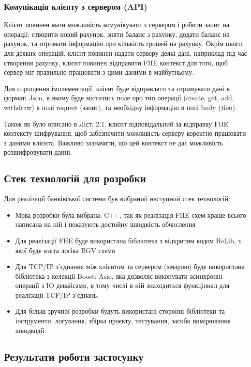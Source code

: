 \subsubsection*{Комунікація клієнту з сервером (API)}
Клієнт повинен мати можливість комунікувати з сервером і робити запит на операції: створити
новий рахунок, зняти баланс з рахунку, додати баланс на рахунок, та отримати інформацію
про кількість грошей на рахунку. Окрім цього, для деяких операцій, клієнт повинен надати
серверу деякі дані, наприклад під час створення рахунку, клієнт повинен відправити FHE контекст
для того, щоб сервер міг правильно працювати з цими даними в майбутньому.

Для спрощення імплементації, клієнт буде відправляти та отримувати дані в форматі Json, в
якому буде міститись поле про тип операції (create, get, add, withdraw) в полі 
request (запит), та необхідну інформацію в полі body (тіло).

Також як було описано в Ліст. 2.1. клієнт відповідальний за відправку FHE контексту шифрування,
щоб забезпечити можливість серверу коректно працювати з даними клієнта. Важливо зазначити, що
цей контекст не дає можливість розшифровувати данні.

\subsection{Стек технологій для розробки}
Для реалізації банківської системи був вибраний наступний стек технологій:
\begin{itemize}

    \item{Мова розробки була вибрана: C++, так як реалізація FHE схем краще всього написана
на ній і показують достойну швидкість обчислення}
    \item{Для реалізації FHE буде використана бібліотека з відкритим кодом HeLib, з
якої буде взята логіка BGV схеми}
    \item{Для TCP/IP з'єднання між клієнтом та сервером (хмарою) буде використана бібліотека
з колекції Boost: Asio, яка дозволяє виконувати асинхронні операції з IO девайсами, в тому
числі в ній знаходиться функціонал для реалізації TCP/IP з'єднань.}
    \item{Для більш зручної розробки будуть використані сторонні бібліотеки та інструменти:
логування, збірка проєкту, тестування, засоби вимірювання швидкодії.}
\end{itemize}

\subsection{Результати роботи застосунку}


